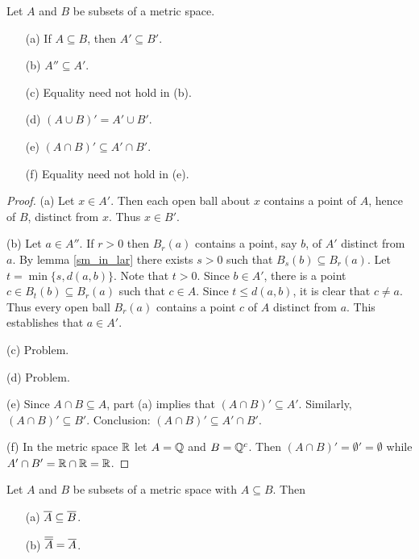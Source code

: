 \begin{prop}\label{prop_accpt} Let $A$ and $B$ be subsets of a metric space.
 \begin{enumerate}
  \item[(a)] If $A \subseteq B$, then $A' \subseteq B'$.
  \item[(b)]  $A'' \subseteq A'$.
  \item[(c)] Equality need not hold in \textup{(b)}.
  \item[(d)] $(A \cup B)' = A' \cup B'$.
  \item[(e)] $(A \cap B)' \subseteq A' \cap B'$.
  \item[(f)] Equality need not hold in \textup{(e)}.
 \end{enumerate}
\end{prop}

\begin{proof} (a) Let $x \in A'$. Then each open ball about $x$ contains a point of $A$, hence
of $B$, distinct from $x$. Thus $x \in B'$.

(b) Let $a \in A''$. If $r>0$ then $B_r(a)$ contains a point, say $b$, of $A'$ distinct from
$a$. By lemma \ref{sm_in_lar} there exists $s > 0$ such that $B_s(b) \subseteq B_r(a)$. Let $t
= \min\{s,d(a,b)\}$. Note that $t > 0$. Since $b \in A'$, there is a point $c \in B_t(b)
\subseteq B_r(a)$ such that $c \in A$. Since $t \le d(a,b)$, it is clear that $c \ne a$. Thus
every open ball $B_r(a)$ contains a point $c$ of $A$ distinct from $a$. This establishes that
$a \in A'$.

(c) Problem.

(d) Problem.

(e) Since $A \cap B \subseteq A$, part (a) implies that $(A \cap B)' \subseteq A'$. Similarly,
$(A \cap B)' \subseteq B'$. Conclusion: $(A \cap B)' \subseteq A' \cap B'$.

(f) In the metric space $\mathbb{R}$ let $A = \mathbb{Q}$ and $B = \mathbb{Q}^c$. Then $(A \cap B)' = \emptyset' =
\emptyset$ while $A' \cap B' = \mathbb{R} \cap \mathbb{R} = \mathbb{R}$.
\end{proof}

\begin{prop}\label{prop_clo} Let $A$ and $B$ be subsets of a metric space with $A \subseteq B$.
Then
 \begin{enumerate}
  \item[(a)] $\overline{A} \subseteq \overline{B}$.
  \item[(b)] $\overline{\overline{A}} = \overline{A}$.
 \end{enumerate}
\end{prop}


